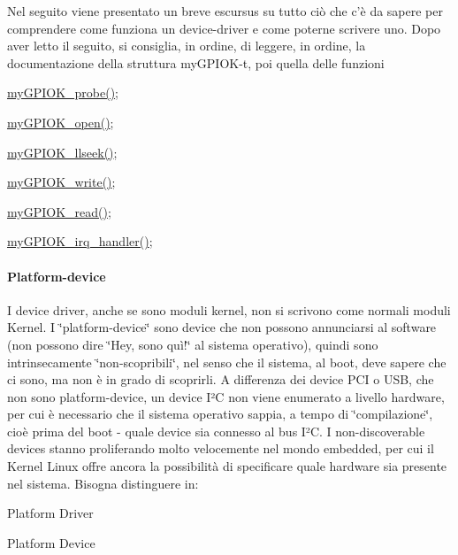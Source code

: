 Nel seguito viene presentato un breve escursus su tutto ciò che c'è da sapere per comprendere come funziona un device-\/driver e come poterne scrivere uno. Dopo aver letto il seguito, si consiglia, in ordine, di leggere, in ordine, la documentazione della struttura my\+G\+P\+I\+O\+K-\/t, poi quella delle funzioni
\begin{DoxyItemize}
\item \hyperlink{group___linux-_driver_gae40973a06d72f7c41a9af07513a62307}{my\+G\+P\+I\+O\+K\+\_\+probe()};
\item \hyperlink{group___linux-_driver_gad013759c18fbf6ea96005b9b3bfa5b4e}{my\+G\+P\+I\+O\+K\+\_\+open()};
\item \hyperlink{group___linux-_driver_ga66e7f726b72320a272b633ecbaecefff}{my\+G\+P\+I\+O\+K\+\_\+llseek()};
\item \hyperlink{group___linux-_driver_ga1eea0f6c86e8966ba9b701da57502aad}{my\+G\+P\+I\+O\+K\+\_\+write()};
\item \hyperlink{group___linux-_driver_ga90ac339df9c02ae5f11a2a7727adc923}{my\+G\+P\+I\+O\+K\+\_\+read()};
\item \hyperlink{group___linux-_driver_ga2fc230a12a97aa63e43b2dc4aec73511}{my\+G\+P\+I\+O\+K\+\_\+irq\+\_\+handler()};
\end{DoxyItemize}

\paragraph*{Platform-\/device}

I device driver, anche se sono moduli kernel, non si scrivono come normali moduli Kernel. I \char`\"{}platform-\/device\char`\"{} sono device che non possono annunciarsi al software (non possono dire \char`\"{}\+Hey,
sono quì!\char`\"{} al sistema operativo), quindi sono intrinsecamente \char`\"{}non-\/scopribili\char`\"{}, nel senso che il sistema, al boot, deve sapere che ci sono, ma non è in grado di scoprirli. A differenza dei device P\+C\+I o U\+S\+B, che non sono platform-\/device, un device I²\+C non viene enumerato a livello hardware, per cui è necessario che il sistema operativo sappia, a tempo di \char`\"{}compilazione\char`\"{}, cioè prima del boot -\/ quale device sia connesso al bus I²\+C. I non-\/discoverable devices stanno proliferando molto velocemente nel mondo embedded, per cui il Kernel Linux offre ancora la possibilità di specificare quale hardware sia presente nel sistema. Bisogna distinguere in\+:
\begin{DoxyItemize}
\item Platform Driver
\item Platform Device
\end{DoxyItemize}

